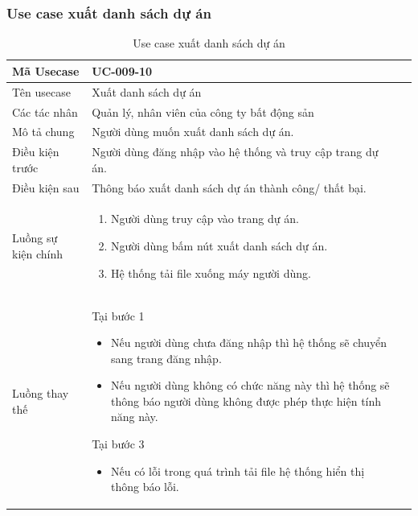 \documentclass[12pt,a4paper]{article}
\begin{document}
    \subsubsection*{Use case xuất danh sách dự án}
    \begin{table}[H]
        \centering
        \begin{tabular}{|p{3.5cm}|p{11.5cm}|c|}
            \hline
            Mã Usecase      & UC-009-10                                                  \\
            \hline
            Tên usecase     & Xuất danh sách dự án                                       \\
            \hline
            Các tác nhân    & Quản lý, nhân viên của công ty bất động sản                \\
            \hline
            Mô tả chung     & Người dùng muốn xuất danh sách dự án.                      \\
            \hline

            Điều kiện trước & Người dùng đăng nhập vào hệ thống và truy cập trang dự án. \\
            \hline

            Điều kiện sau   & Thông báo xuất danh sách dự án thành công/ thất bại.       \\
            \hline

            Luồng sự kiện chính & \vspace{-.8cm}\begin{enumerate}
                                                    \item Người dùng truy cập vào trang dự án.
                                                    \item Người dùng bấm nút xuất danh sách dự án.
                                                    \item Hệ thống tải file xuống máy người dùng.
            \end{enumerate}
            \\
            \hline
            Luồng thay thế & Tại bước 1\newline
            \vspace{-.8cm}\begin{itemize}
                              \item Nếu người dùng chưa đăng nhập thì hệ thống sẽ chuyển sang trang đăng nhập.
                              \item Nếu người dùng không có chức năng này thì hệ thống sẽ thông báo người dùng không được phép thực hiện tính năng này.
            \end{itemize}
            Tại bước 3\newline
            \vspace{-.8cm}\begin{itemize}
                              \item Nếu có lỗi trong quá trình tải file hệ thống hiển thị thông báo lỗi.
            \end{itemize}
            \\ \hline
        \end{tabular}
        \caption{Use case xuất danh sách dự án}


\end{table}
\end{document}

